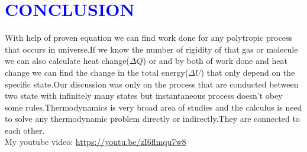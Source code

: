\documentclass[12pt]{article}
\begin{document}
\section{\textcolor{blue}{ CONCLUSION }}
\textsf
With help of proven equation we can find work done for any polytropic process that occurs in universe.If we know the number of rigidity of that gas or molecule we can also calculate heat change($\Delta Q$) or and by both of work done and heat change we can find the change in the total energy($\Delta U$) that only depend on the specific state.Our discussion was only on the process that are conducted between two state with infinitely many states but instantaneous process doesn't obey some rules.Thermodynamics is very broad area of studies and the calculus is need to solve any thermodynamic problem directly or indirectly.They are connected to each other.
\\

\vspace{2cm}
My youtube video:
\url{https://youtu.be/zI6flmqu7w8}

\cite{*}


\end{document}
